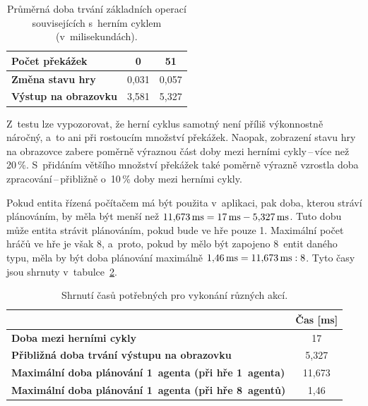 \begin{table}[ht]
    \centering
    \begin{tabular}{|l|c|c|} \hline
        \textbf{Počet překážek}      & \textbf{0} & \textbf{51} \\ \hline\hline
        \textbf{Změna stavu hry}     & 0,031      & 0,057       \\ \hline
        \textbf{Výstup na obrazovku} & 3,581      & 5,327       \\ \hline
    \end{tabular}
    \caption{Průměrná doba trvání základních operací souvisejících s~herním cyklem (v~milisekundách).}
    \label{tab:benchmark-basics}
\end{table}

Z~testu lze vypozorovat, že herní cyklus samotný není příliš výkonnostně náročný, a~to ani při rostoucím množství překážek. Naopak, zobrazení stavu hry na obrazovce zabere poměrně výraznou část doby mezi herními cykly\,--\,více než 20\,\%. S~přidáním většího množství překážek také poměrně výrazně vzrostla doba zpracování\,--\,přibližně o~10\,\% doby mezi herními cykly.

Pokud entita řízená počítačem má být použita v~aplikaci, pak doba, kterou stráví plánováním, by měla být menší než $11{,}673\text{\,ms} = 17\text{\,ms} - 5{,}327\text{\,ms}$. Tuto dobu může entita strávit plánováním, pokud bude ve hře pouze 1. Maximální počet hráčů ve hře je však 8, a~proto, pokud by mělo být zapojeno 8~entit daného typu, měla by být doba plánování maximálně $1{,}46\text{\,ms} = 11{,}673\text{\,ms} : 8$. Tyto časy jsou shrnuty v~tabulce~\ref{tab:times-summary}.

\begin{table}[ht]
    \centering
    \begin{tabular}{|p{}|c|} \hline
         & \textbf{Čas [ms]} \\ \hline
        \textbf{Doba mezi herními cykly}                    & 17    \\ \hline
        \textbf{Přibližná doba trvání výstupu na obrazovku} & 5,327 \\ \hline
        \textbf{Maximální doba plánování 1~agenta (při hře 1~agenta)} & 11,673 \\ \hline
        \textbf{Maximální doba plánování 1~agenta (při hře 8~agentů)} & 1,46   \\ \hline
    \end{tabular}
    \caption{Shrnutí časů potřebných pro vykonání různých akcí.}
    \label{tab:times-summary}
\end{table}

